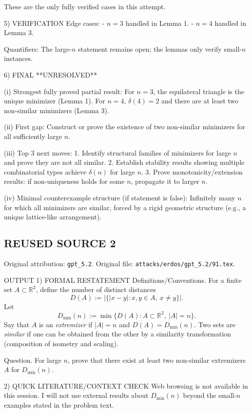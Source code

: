 These are the only fully verified cases in this attempt.

5) VERIFICATION
Edge cases:
- $n=3$ handled in Lemma 1.
- $n=4$ handled in Lemma 3.

Quantifiers:
The large-$n$ statement remains open; the lemmas only verify small-$n$ instances.

6) FINAL
**UNRESOLVED**

(i) Strongest fully proved partial result:
For $n=3$, the equilateral triangle is the unique minimizer (Lemma 1). For $n=4$, $\delta(4)=2$ and
there are at least two non-similar minimizers (Lemma 3).

(ii) First gap:
Construct or prove the existence of two non-similar minimizers for all sufficiently large $n$.

(iii) Top 3 next moves:
1. Identify structural families of minimizers for large $n$ and prove they are not all similar.
2. Establish stability results showing multiple combinatorial types achieve $\delta(n)$ for large $n$.
3. Prove monotonicity/extension results: if non-uniqueness holds for some $n$, propagate it to larger $n$.

(iv) Minimal counterexample structure (if statement is false):
Infinitely many $n$ for which all minimizers are similar, forced by a rigid geometric structure
(e.g., a unique lattice-like arrangement).


\subsection*{REUSED SOURCE 2}
Original attribution: \texttt{gpt\_5.2}.
Original file: \texttt{attacks/erdos/gpt\_5.2/91.tex}.


OUTPUT
1) FORMAL RESTATEMENT
Definitions/Conventions.
For a finite set $A\subset\mathbb R^2$, define the number of distinct distances
\[D(A):=\big|\{|x-y|: x,y\in A,\ x\ne y\}\big|.\]
Let
\[D_{\min}(n):=\min\{D(A): A\subset\mathbb R^2,\ |A|=n\}.\]
Say that $A$ is an \emph{extremizer} if $|A|=n$ and $D(A)=D_{\min}(n)$.
Two sets are \emph{similar} if one can be obtained from the other by a similarity transformation (composition of isometry and scaling).

Question.
For large $n$, prove that there exist at least two non-similar extremizers $A$ for $D_{\min}(n)$.

2) QUICK LITERATURE/CONTEXT CHECK
Web browsing is not available in this session.
I will not use external results about $D_{\min}(n)$ beyond the small-$n$ examples stated in the problem text.

